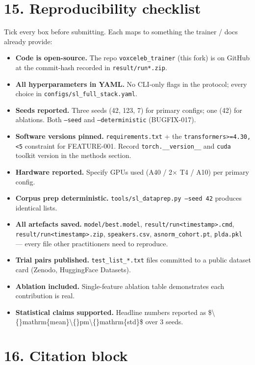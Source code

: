 \documentclass[10pt,a4paper]{article}
\begin{document}
\section*{15. Reproducibility checklist}

Tick every box before submitting. Each maps to something the trainer / docs already provide:

\begin{itemize}[leftmargin=*,itemsep=2pt]
  \item [ ] \textbf{Code is open-source.} The repo \texttt{voxceleb\_trainer} (this fork) is on GitHub at the commit-hash recorded in \texttt{result/run*.zip}.
  \item [ ] \textbf{All hyperparameters in YAML.} No CLI-only flags in the protocol; every choice in \texttt{configs/sl\_full\_stack.yaml}.
  \item [ ] \textbf{Seeds reported.} Three seeds (42, 123, 7) for primary configs; one (42) for ablations. Both \texttt{--seed} and \texttt{--deterministic} (BUGFIX-017).
  \item [ ] \textbf{Software versions pinned.} \texttt{requirements.txt} + the \texttt{transformers>=4.30,<5} constraint for FEATURE-001. Record \texttt{torch.\_\_version\_\_} and \texttt{cuda} toolkit version in the methods section.
  \item [ ] \textbf{Hardware reported.} Specify GPUs used (A40 / 2$\times$ T4 / A10) per primary config.
  \item [ ] \textbf{Corpus prep deterministic.} \texttt{tools/sl\_dataprep.py --seed 42} produces identical lists.
  \item [ ] \textbf{All artefacts saved.} \texttt{model/best.model}, \texttt{result/run<timestamp>.cmd}, \texttt{result/run<timestamp>.zip}, \texttt{speakers.csv}, \texttt{asnorm\_cohort.pt}, \texttt{plda.pkl} --- every file other practitioners need to reproduce.
  \item [ ] \textbf{Trial pairs published.} \texttt{test\_list\_*.txt} files committed to a public dataset card (Zenodo, HuggingFace Datasets).
  \item [ ] \textbf{Ablation included.} Single-feature ablation table demonstrates each contribution is real.
  \item [ ] \textbf{Statistical claims supported.} Headline numbers reported as \$\textbackslash\{\}mathrm\{mean\}\textbackslash\{\}pm\textbackslash\{\}mathrm\{std\}\$ over 3 seeds.
\end{itemize}

\section*{16. Citation block}
\end{document}
